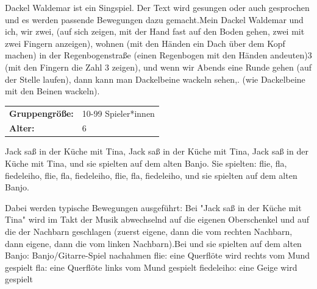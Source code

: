 Dackel Waldemar ist ein Singspiel. Der Text wird gesungen oder auch gesprochen und es werden passende Bewegungen dazu gemacht.Mein Dackel Waldemar und ich, wir zwei, (auf sich zeigen, mit der Hand fast auf den Boden gehen, zwei mit zwei Fingern anzeigen), wohnen (mit den Händen ein Dach über dem Kopf machen) in der Regenbogenstraße (einen Regenbogen mit den Händen andeuten)3 (mit den Fingern die Zahl 3 zeigen), und wenn wir Abends eine Runde gehen (auf der Stelle laufen), dann kann man Dackelbeine wackeln sehen,. (wie Dackelbeine mit den Beinen wackeln). \\



\begin{table}[H]
\begin{tabular}{>{\bfseries}lp{8cm}}
   Gruppengröße:   & 10-99 Spieler*innen\\
    Alter: & 6 \\
\end{tabular}
\end{table} 
Jack saß in der Küche mit Tina, \newline
Jack saß in der Küche mit Tina,\newline
Jack saß in der Küche mit Tina,\newline
und sie spielten auf dem alten Banjo.\newline
Sie spielten: \newline
flie, fla, fiedeleiho, \newline
flie, fla, fiedeleiho,\newline
flie, fla, fiedeleiho,\newline
und sie spielten auf dem alten Banjo.\newline\newline

Dabei werden typische Bewegungen ausgeführt:\newline
\newline
Bei "Jack saß in der Küche mit Tina" wird im Takt der Musik abwechselnd auf die eigenen Oberschenkel und auf die der Nachbarn geschlagen (zuerst eigene, dann die vom rechten Nachbarn, dann eigene, dann die vom linken Nachbarn).Bei und sie spielten auf dem alten Banjo: Banjo/Gitarre-Spiel nachahmen flie: eine Querflöte wird rechts vom Mund gespielt fla: eine Querflöte links vom Mund gespielt fiedeleiho: eine Geige wird gespielt


